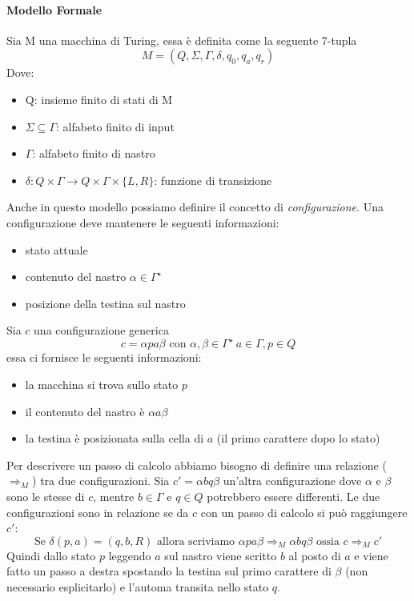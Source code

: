 \paragraph{Modello Formale} Sia M una macchina di Turing, essa è definita come la seguente 7-tupla
\[
	M = (Q,\Sigma,\Gamma,\delta,q_0,q_a,q_r) 
\]
Dove:
\begin{itemize}
	\item Q: insieme finito di stati di M
	\item $\Sigma \subseteq \Gamma$: alfabeto finito di input 
	\item $\Gamma$: alfabeto finito di nastro
	\item $\delta: Q\times\Gamma \to Q \times \Gamma \times\{L,R\}$: funzione di transizione
\end{itemize}
Anche in questo modello possiamo definire il concetto di \textit{configurazione}. Una configurazione deve mantenere le seguenti informazioni:
\begin{itemize}
	\item stato attuale 
	\item contenuto del nastro $\alpha \in \Gamma^{\star}$
	\item posizione della testina sul nastro
\end{itemize}
Sia $c$ una configurazione generica 
$$
c = \alpha p a \beta \text{ con }\alpha, \beta \in \Gamma^{\star} \ a \in \Gamma,  p \in Q
$$
essa ci fornisce le seguenti informazioni:
\begin{itemize}
	\item la macchina si trova sullo stato $p$
	\item il contenuto del nastro è $\alpha a \beta$
	\item la testina è posizionata sulla cella di $a$ (il primo carattere dopo lo stato)
\end{itemize}
Per descrivere un passo di calcolo abbiamo bisogno di definire una relazione ($\Rightarrow_M$) tra due configurazioni. Sia $c' = \alpha b q \beta$ un'altra configurazione dove $\alpha$ e $\beta$ sono le stesse di $c$, mentre $b \in \Gamma$ e $q \in Q$ potrebbero essere differenti. Le due configurazioni sono in relazione se da $c$ con un passo di calcolo si può raggiungere $c'$:
\[
	\text{Se }\delta(p,a) = (q, b, R) \text{ allora scriviamo } \alpha p a \beta \Rightarrow_M \alpha b q \beta \text{ ossia }  c \Rightarrow_M c' 
\]
Quindi dallo stato $p$ leggendo $a$ sul nastro viene scritto $b$ al posto di $a$ e viene fatto un passo a destra spostando la testina sul primo carattere di $\beta$ (non necessario esplicitarlo) e l'automa transita nello stato $q$.

